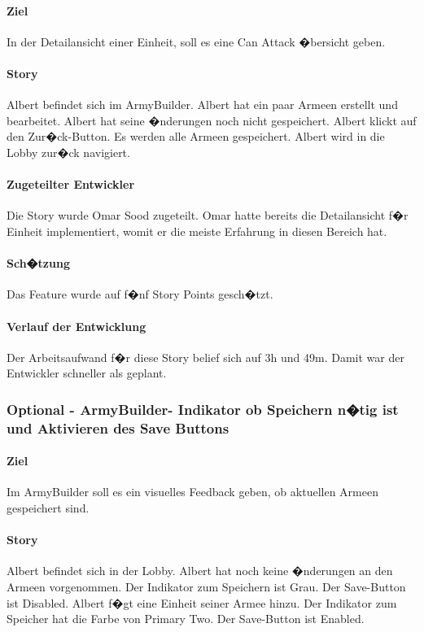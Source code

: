 \documentclass[12pt, titlepage]{scrartcl}
\begin{document}
			\paragraph{Ziel} In der Detailansicht einer Einheit, soll es eine Can Attack �bersicht geben.
			\paragraph{Story} Albert befindet sich im ArmyBuilder. Albert hat ein paar Armeen erstellt und bearbeitet. Albert hat seine �nderungen noch nicht gespeichert. Albert klickt auf den Zur�ck-Button. Es werden alle Armeen gespeichert. Albert wird in die Lobby zur�ck navigiert.
			\paragraph{Zugeteilter Entwickler} Die Story wurde Omar Sood zugeteilt. Omar hatte bereits die Detailansicht f�r Einheit implementiert, womit er die meiste Erfahrung in diesen Bereich hat.
			\paragraph{Sch�tzung}
			Das Feature wurde auf f�nf Story Points gesch�tzt.
			\paragraph{Verlauf der Entwicklung} 
			Der Arbeitsaufwand f�r diese Story belief sich auf 3h und 49m. Damit war der Entwickler schneller als geplant.
			\subsubsection{Optional - ArmyBuilder- Indikator ob Speichern n�tig ist und Aktivieren des Save Buttons}
			\paragraph{Ziel} Im ArmyBuilder soll es ein visuelles Feedback geben, ob aktuellen Armeen gespeichert sind.
			\paragraph{Story} Albert befindet sich in der Lobby. Albert hat noch keine �nderungen an den Armeen vorgenommen. Der Indikator zum Speichern ist Grau. Der Save-Button ist Disabled. Albert f�gt eine Einheit seiner Armee hinzu. Der Indikator zum Speicher hat die Farbe von Primary Two. Der Save-Button ist Enabled.
\end{document}
